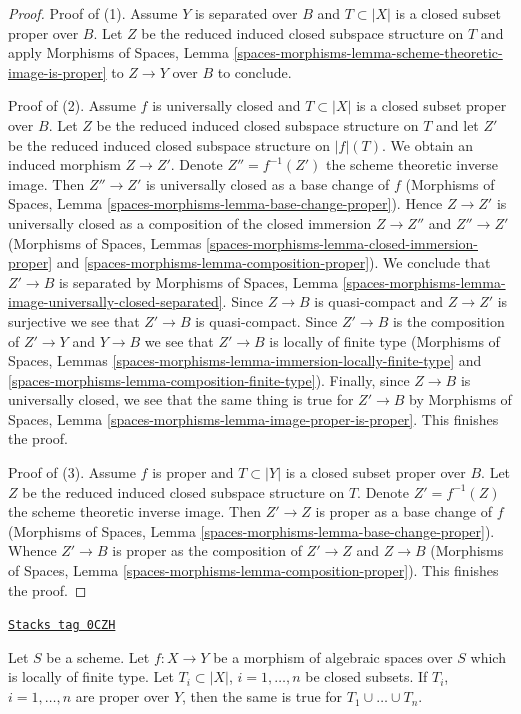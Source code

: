 \begin{proof}
Proof of (1). Assume $Y$ is separated over $B$ and $T \subset |X|$
is a closed subset proper over $B$. Let $Z$ be the reduced induced
closed subspace structure on $T$ and apply
Morphisms of Spaces, Lemma
\ref{spaces-morphisms-lemma-scheme-theoretic-image-is-proper}
to $Z \to Y$ over $B$ to conclude.

\medskip\noindent
Proof of (2). Assume $f$ is universally closed and $T \subset |X|$ is a
closed subset proper over $B$. Let $Z$ be the reduced induced
closed subspace structure on $T$ and let $Z'$ be the reduced
induced closed subspace structure on $|f|(T)$. We obtain an induced
morphism $Z \to Z'$.
Denote $Z'' = f^{-1}(Z')$ the scheme theoretic inverse image.
Then $Z'' \to Z'$ is universally closed as a base change of $f$
(Morphisms of Spaces, Lemma \ref{spaces-morphisms-lemma-base-change-proper}).
Hence $Z \to Z'$ is universally closed as a composition of
the closed immersion $Z \to Z''$ and $Z'' \to Z'$
(Morphisms of Spaces, Lemmas
\ref{spaces-morphisms-lemma-closed-immersion-proper} and
\ref{spaces-morphisms-lemma-composition-proper}).
We conclude that $Z' \to B$ is separated by
Morphisms of Spaces, Lemma
\ref{spaces-morphisms-lemma-image-universally-closed-separated}.
Since $Z \to B$ is quasi-compact and $Z \to Z'$ is surjective
we see that $Z' \to B$ is quasi-compact.
Since $Z' \to B$ is the composition of $Z' \to Y$ and $Y \to B$
we see that $Z' \to B$ is locally of finite type
(Morphisms of Spaces, Lemmas
\ref{spaces-morphisms-lemma-immersion-locally-finite-type} and
\ref{spaces-morphisms-lemma-composition-finite-type}).
Finally, since $Z \to B$ is universally closed, we see that
the same thing is true for $Z' \to B$ by
Morphisms of Spaces, Lemma
\ref{spaces-morphisms-lemma-image-proper-is-proper}.
This finishes the proof.

\medskip\noindent
Proof of (3). Assume $f$ is proper and $T \subset |Y|$ is a closed subset
proper over $B$. Let $Z$ be the reduced induced closed subspace
structure on $T$. Denote $Z' = f^{-1}(Z)$ the scheme theoretic inverse image.
Then $Z' \to Z$ is proper as a base change of $f$
(Morphisms of Spaces, Lemma \ref{spaces-morphisms-lemma-base-change-proper}).
Whence $Z' \to B$ is proper as the composition of $Z' \to Z$
and $Z \to B$
(Morphisms of Spaces, Lemma \ref{spaces-morphisms-lemma-composition-proper}).
This finishes the proof.
\end{proof}

\begin{lemma}
\label{spaces-perfect-lemma-union-closed-proper-over-base}
\href{https://stacks.math.columbia.edu/tag/0CZH}{\texttt{Stacks tag 0CZH}}

Let $S$ be a scheme.
Let $f : X \to Y$ be a morphism of algebraic spaces over $S$
which is locally of finite type.
Let $T_i \subset |X|$, $i = 1, \ldots, n$ be closed subsets.
If $T_i$, $i = 1, \ldots, n$ are proper over $Y$, then the same is
true for $T_1 \cup \ldots \cup T_n$.
\end{lemma}

